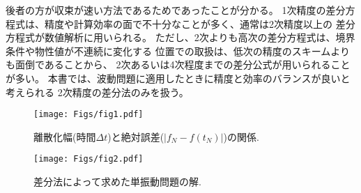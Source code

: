 \documentclass[10pt,a4j,dvipdfmx]{jarticle}
\begin{document}
後者の方が収束が速い方法であるためであったことが分かる。
1次精度の差分方程式は、精度や計算効率の面で不十分なことが多く、通常は2次精度以上の
差分方程式が数値解析に用いられる。
ただし、2次よりも高次の差分方程式は、境界条件や物性値が不連続に変化する
位置での取扱は、低次の精度のスキームよりも面倒であることから、
2次あるいは4次程度までの差分公式が用いられることが多い。
本書では、波動問題に適用したときに精度と効率のバランスが良いと考えられる
2次精度の差分法のみを扱う。
\begin{figure}[h]
	\begin{center}
	\texttt{[image: Figs/fig1.pdf]} 
	\end{center}
	\caption{離散化幅(時間$\Delta t$)と絶対誤差($\left| f_N-f(t_N)\right|$)の関係.} 
	\label{fig:fig1}
\end{figure}
\begin{figure}[h]
	\begin{center}
	\texttt{[image: Figs/fig2.pdf]} 
	\end{center}
	\caption{差分法によって求めた単振動問題の解.} 
	\label{fig:fig2}
\end{figure}
\\
\end{document}
